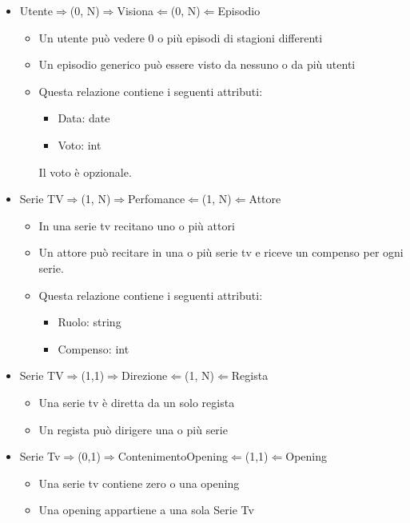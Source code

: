 \documentclass[10pt,a4paper]{article}
\begin{document}
\begin{itemize}
\begin{itemize}
    \end{itemize}
    \item Utente$\Rightarrow$(0, N)$\Rightarrow$Visiona$\Leftarrow$(0, N)$\Leftarrow$Episodio
    \begin{itemize}
        \item Un utente può vedere 0 o più episodi di stagioni differenti
        \item Un episodio generico può essere visto da nessuno o da più utenti
        \item Questa relazione contiene i seguenti attributi:
        \begin{itemize}
            \item Data: date
            \item Voto: int
        \end{itemize}
        Il voto è opzionale.\newpage
    \end{itemize}
    \item Serie TV$\Rightarrow$(1, N)$\Rightarrow$Perfomance$\Leftarrow$(1, N)$\Leftarrow$Attore
    \begin{itemize}
            \item In una serie tv recitano uno o più attori
            \item Un attore può recitare in una o più serie tv e riceve un compenso per ogni serie.
            \item Questa relazione contiene i seguenti attributi:
            \begin{itemize}
                \item Ruolo: string
                \item Compenso: int
        \end{itemize}
    \end{itemize}
    \item Serie TV$\Rightarrow$(1,1)$\Rightarrow$Direzione$\Leftarrow$(1, N)$\Leftarrow$Regista 
    \begin{itemize}
        \item Una serie tv è diretta da un solo regista 
        \item Un regista può dirigere una o più serie 
    \end{itemize}
    \item Serie Tv$\Rightarrow$(0,1)$\Rightarrow$ContenimentoOpening$\Leftarrow$(1,1)$\Leftarrow$Opening
    \begin{itemize}
        \item Una serie tv contiene zero o una opening
        \item Una opening appartiene a una sola Serie Tv 
    \end{itemize} 
\end{itemize}
\end{document}
